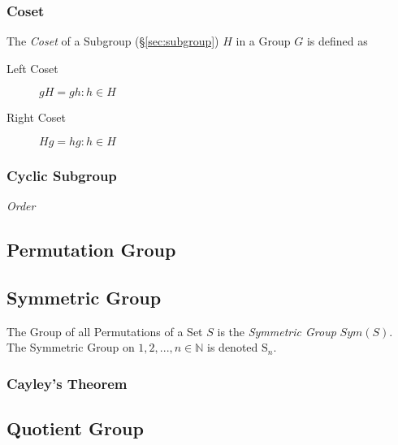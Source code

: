 \subsubsection{Coset}\label{sec:group_coset}

The \emph{Coset} of a Subgroup (\S\ref{sec:subgroup}) $H$ in a Group $G$
is defined as
\begin{description}
\item[Left Coset] $gH = {gh : h \in H}$
\item[Right Coset] $Hg = {hg : h \in H}$
\end{description}


\subsubsection{Cyclic Subgroup}\label{sec:cyclic_subgroup}

\emph{Order}



\subsection{Permutation Group}\label{sec:permutation_group}

\subsection{Symmetric Group}\label{sec:symmetric_group}

The Group of all Permutations of a Set $S$ is the \emph{Symmetric
  Group} $Sym(S)$. The Symmetric Group on ${1, 2, ..., n} \in
\mathbb{N}$ is denoted $\mathrm{S}_n$.

\subsubsection{Cayley's Theorem}\label{sec:cayleys_theorem}



\subsection{Quotient Group}\label{sec:quotient_group}

